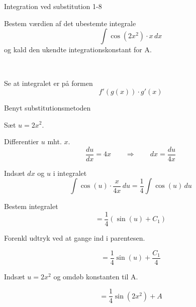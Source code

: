 \documentclass{article}
\begin{document}
\begin{exercise}{Integration ved substitution 1-8}
	
	
	Bestem værdien af det ubestemte integrale
	\[
	\int \cos(2x^2) \cdot x \, dx
	\]
	og kald den ukendte integrationskonstant for A.
	
	 \\
	
	
	
	\hint
	
	Se at integralet er på formen
	\[
	f'(g(x)) \cdot g'(x)
	\]
	
	\hint
	
	Benyt substitutionsmetoden
	
	\hint
	
	Sæt $u=2x^2$.
	
	
	\hint
	
	Differentier $u$ mht. $x$.
	\[
	\frac{du}{dx} = 4x \qquad	\Rightarrow \qquad dx = \frac{du}{4x}
	\]
	
	\hint
	
	Indsæt $dx$ og $u$ i integralet
	\[
	\int \cos(u) \cdot \frac{x}{4x} \, du = \frac{1}{4} \int \cos(u) \, du
	\]
	
	\hint
	
	Bestem integralet
	\[
	= \frac{1}{4} \left( \sin(u) + C_1 \right)
	\]
	
	\hint
	Forenkl udtryk ved at gange ind i parentesen.
	
	\hint
	
	\[
	= \frac{1}{4} \sin(u) + \frac{C_1}{4}
	\]
	
	\hint
	
	Indsæt $u = 2x^2$ og omdøb konstanten  til A.
	
	\hint
	
	\[
	= \frac{1}{4} \sin(2x^2) + A
	\]
	
	
\end{exercise}
\end{document}
